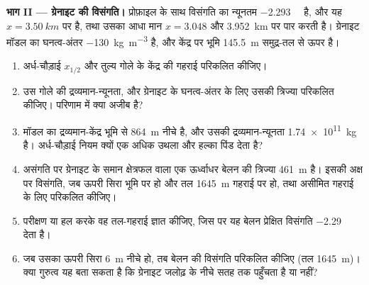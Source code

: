 \begin{problem}
\medskip\noindent\textbf{भाग II --- ग्रेनाइट की विसंगति।} प्रोफ़ाइल के साथ विसंगति का
न्यूनतम \qty{-2.293}{\milli\gal} है, और यह
$x = \qty{3.50}{km}$ पर है, तथा उसका आधा मान $x = 3.048$ और
\qty{3.952}{km} पर पार करती है। ग्रेनाइट मॉडल का घनत्व-अंतर
\qty{-130}{kg.m^{-3}} है, और केंद्र पर भूमि \qty{145.5}{m}
समुद्र-तल से ऊपर है।
\begin{enumerate}[resume]
\item अर्ध-चौड़ाई $x_{1/2}$ और तुल्य गोले के केंद्र की
  गहराई परिकलित कीजिए।
\item उस गोले की द्रव्यमान-न्यूनता, और ग्रेनाइट के घनत्व-अंतर के लिए उसकी
  त्रिज्या परिकलित कीजिए। परिणाम में क्या अजीब है?
\item मॉडल का द्रव्यमान-केंद्र भूमि से \qty{864}{m} नीचे है, और उसकी
  द्रव्यमान-न्यूनता \qty{1.74e11}{kg} है। अर्ध-चौड़ाई नियम क्यों
  एक अधिक उथला और हल्का पिंड देता है?
\item असंगति पर ग्रेनाइट के समान क्षेत्रफल वाला एक ऊर्ध्वाधर बेलन
  की त्रिज्या \qty{461}{m} है। इसकी अक्ष पर विसंगति, जब ऊपरी सिरा
  भूमि पर हो और तल \qty{1645}{m} गहराई पर हो, तथा असीमित गहराई के लिए
  परिकलित कीजिए।
\item परीक्षण या हल करके वह तल-गहराई ज्ञात कीजिए, जिस पर यह
  बेलन प्रेक्षित विसंगति \qty{-2.29}{\milli\gal} देता है।
\item जब उसका ऊपरी सिरा \qty{6}{m} नीचे हो, तब बेलन की विसंगति
  परिकलित कीजिए (तल \qty{1645}{m})। क्या गुरुत्व यह बता सकता है कि ग्रेनाइट
  जलोढ़ के नीचे सतह तक पहुँचता है या नहीं?
\end{enumerate}


\end{problem}
